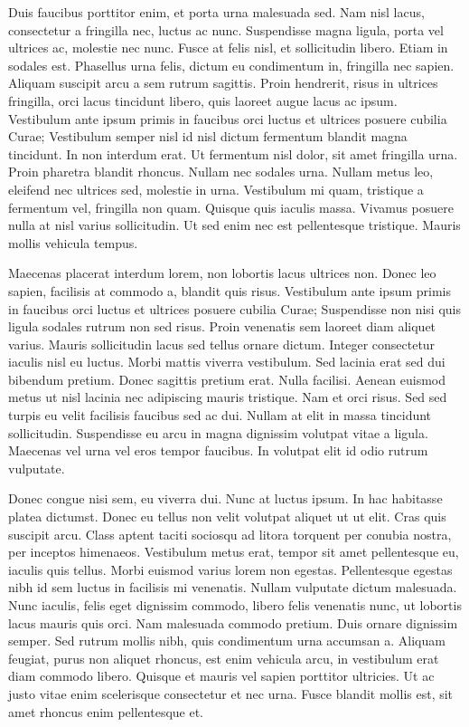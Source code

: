 Duis faucibus porttitor enim, et porta urna malesuada sed. Nam nisl lacus, consectetur a fringilla nec, luctus ac nunc. Suspendisse magna ligula, porta vel ultrices ac, molestie nec nunc. Fusce at felis nisl, et sollicitudin libero. Etiam in sodales est. Phasellus urna felis, dictum eu condimentum in, fringilla nec sapien. Aliquam suscipit arcu a sem rutrum sagittis. Proin hendrerit, risus in ultrices fringilla, orci lacus tincidunt libero, quis laoreet augue lacus ac ipsum. Vestibulum ante ipsum primis in faucibus orci luctus et ultrices posuere cubilia Curae; Vestibulum semper nisl id nisl dictum fermentum blandit magna tincidunt. In non interdum erat. Ut fermentum nisl dolor, sit amet fringilla urna. Proin pharetra blandit rhoncus. Nullam nec sodales urna. Nullam metus leo, eleifend nec ultrices sed, molestie in urna. Vestibulum mi quam, tristique a fermentum vel, fringilla non quam. Quisque quis iaculis massa. Vivamus posuere nulla at nisl varius sollicitudin. Ut sed enim nec est pellentesque tristique. Mauris mollis vehicula tempus.

Maecenas placerat interdum lorem, non lobortis lacus ultrices non. Donec leo sapien, facilisis at commodo a, blandit quis risus. Vestibulum ante ipsum primis in faucibus orci luctus et ultrices posuere cubilia Curae; Suspendisse non nisi quis ligula sodales rutrum non sed risus. Proin venenatis sem laoreet diam aliquet varius. Mauris sollicitudin lacus sed tellus ornare dictum. Integer consectetur iaculis nisl eu luctus. Morbi mattis viverra vestibulum. Sed lacinia erat sed dui bibendum pretium. Donec sagittis pretium erat. Nulla facilisi. Aenean euismod metus ut nisl lacinia nec adipiscing mauris tristique. Nam et orci risus. Sed sed turpis eu velit facilisis faucibus sed ac dui. Nullam at elit in massa tincidunt sollicitudin. Suspendisse eu arcu in magna dignissim volutpat vitae a ligula. Maecenas vel urna vel eros tempor faucibus. In volutpat elit id odio rutrum vulputate.

Donec congue nisi sem, eu viverra dui. Nunc at luctus ipsum. In hac habitasse platea dictumst. Donec eu tellus non velit volutpat aliquet ut ut elit. Cras quis suscipit arcu. Class aptent taciti sociosqu ad litora torquent per conubia nostra, per inceptos himenaeos. Vestibulum metus erat, tempor sit amet pellentesque eu, iaculis quis tellus. Morbi euismod varius lorem non egestas. Pellentesque egestas nibh id sem luctus in facilisis mi venenatis. Nullam vulputate dictum malesuada. Nunc iaculis, felis eget dignissim commodo, libero felis venenatis nunc, ut lobortis lacus mauris quis orci. Nam malesuada commodo pretium. Duis ornare dignissim semper. Sed rutrum mollis nibh, quis condimentum urna accumsan a. Aliquam feugiat, purus non aliquet rhoncus, est enim vehicula arcu, in vestibulum erat diam commodo libero. Quisque et mauris vel sapien porttitor ultricies. Ut ac justo vitae enim scelerisque consectetur et nec urna. Fusce blandit mollis est, sit amet rhoncus enim pellentesque et.

